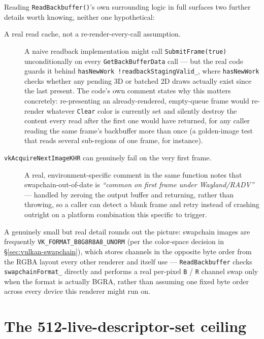 Reading \texttt{ReadBackbuffer()}'s own surrounding logic in full surfaces two further details
worth knowing, neither one hypothetical:

\begin{description}
  \item[A real read cache, not a re-render-every-call assumption.] A naive readback
        implementation might call \texttt{SubmitFrame(true)} unconditionally on every
        \texttt{GetBackBufferData} call --- but the real code guards it behind
        \texttt{hasNewWork \textbar\textbar{} !readbackStagingValid\_}, where
        \texttt{hasNewWork} checks whether any pending 3D or batched 2D draws actually exist
        since the last present. The code's own comment states why this matters concretely:
        re-presenting an already-rendered, empty-queue frame would re-render whatever
        \texttt{Clear} color is currently set and silently destroy the content every read
        after the first one would have returned, for any caller reading the same frame's
        backbuffer more than once (a golden-image test that reads several sub-regions of one
        frame, for instance).
  \item[\texttt{vkAcquireNextImageKHR} can genuinely fail on the very first frame.] A real,
        environment-specific comment in the same function notes that swapchain-out-of-date is
        \emph{``common on first frame under Wayland/RADV''} --- handled by zeroing the output
        buffer and returning, rather than throwing, so a caller can detect a blank frame and
        retry instead of crashing outright on a platform combination this specific to trigger.
\end{description}

A genuinely small but real detail rounds out the picture: swapchain images are frequently
\texttt{VK\_FORMAT\_B8G8R8A8\_UNORM} (per the color-space decision in
\S\ref{sec:vulkan-swapchain}), which stores channels in the opposite byte order from the RGBA
layout every other renderer and  itself use --- \texttt{ReadBackbuffer} checks
\texttt{swapchainFormat\_} directly and performs a real per-pixel \texttt{B} / \texttt{R} channel
swap only when the format is actually BGRA, rather than assuming one fixed byte order across
every device this renderer might run on.

\section{The 512-live-descriptor-set ceiling}
\label{sec:vulkan-descriptor-ceiling}

